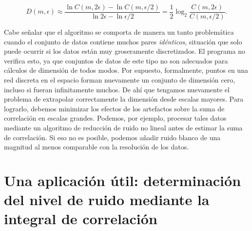 \documentclass[10pt,a4paper]{book}
\begin{document}
\begin{equation}
D(m, \epsilon) \approx \frac{\ln C(m, 2\epsilon) - \ln C(m, \epsilon/2)}{\ln 2\epsilon - \ln \epsilon/2}
= \frac{1}{2} \log_2 \frac{C(m, 2\epsilon)}{C(m, \epsilon/2)}.
\end{equation}

Cabe señalar que el algoritmo se comporta de manera un tanto problemática cuando el conjunto de datos contiene muchos pares \textit{idénticos}, situación que solo puede ocurrir si los datos están muy groseramente discretizados. El programa no verifica esto, ya que conjuntos de datos de este tipo no son adecuados para cálculos de dimensión de todos modos. Por supuesto, formalmente, puntos en una red discreta en el espacio forman nuevamente un conjunto de dimensión cero, incluso si fueran infinitamente muchos. De ahí que tengamos nuevamente el problema de extrapolar correctamente la dimensión desde escalas mayores. Para lograrlo, debemos minimizar los efectos de los artefactos sobre la suma de correlación en escalas grandes. Podemos, por ejemplo, procesar tales datos mediante un algoritmo de reducción de ruido no lineal antes de estimar la suma de correlación. Si eso no es posible, podemos añadir ruido blanco de una magnitud al menos comparable con la resolución de los datos.

\newpage

\section{Una aplicación útil: determinación del nivel de ruido mediante la integral de correlación}
\end{document}
